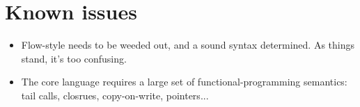 \chapter{Known issues}

\begin{itemize}
\item Flow-style needs to be weeded out, and a sound syntax determined. As things stand, it's too confusing.
\end{itemize}

\begin{itemize}
\item The core language requires a large set of functional-programming semantics: tail calls, closrues, copy-on-write, pointers...
\end{itemize}
